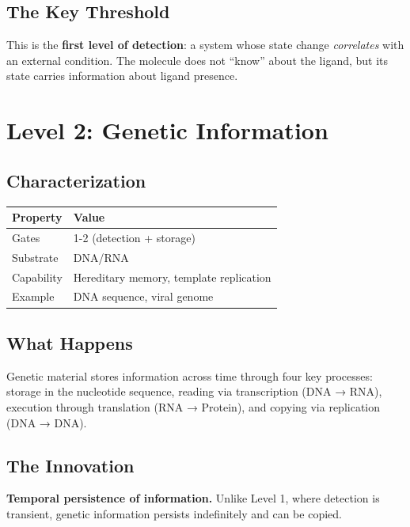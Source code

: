 \documentclass[
  11pt,
  letterpaper,
  twoside,
  openright]{book}
\begin{document}
\subsection{The Key Threshold}\label{the-key-threshold}

This is the \textbf{first level of detection}: a system whose state
change \emph{correlates} with an external condition. The molecule does
not ``know'' about the ligand, but its state carries information about
ligand presence.

\section{Level 2: Genetic
Information}\label{level-2-genetic-information}

\subsection{Characterization}\label{characterization-2}

\begin{longtable}[]{@{}ll@{}}
\toprule\noalign{}
Property & Value \\
\midrule\noalign{}
\endhead
\bottomrule\noalign{}
\endlastfoot
Gates & 1-2 (detection + storage) \\
Substrate & DNA/RNA \\
Capability & Hereditary memory, template replication \\
Example & DNA sequence, viral genome \\
\end{longtable}

\subsection{What Happens}\label{what-happens-2}

Genetic material stores information across time through four key
processes: storage in the nucleotide sequence, reading via transcription
(DNA → RNA), execution through translation (RNA → Protein), and copying
via replication (DNA → DNA).

\subsection{The Innovation}\label{the-innovation}

\textbf{Temporal persistence of information.} Unlike Level 1, where
detection is transient, genetic information persists indefinitely and
can be copied.
\end{document}
